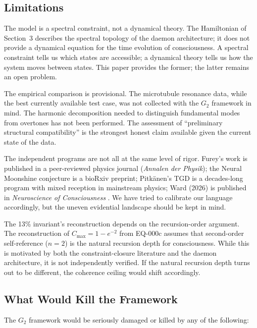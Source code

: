 \documentclass[12pt,a4paper]{article}
\begin{document}
\subsection{Limitations}

The model is a spectral constraint, not a dynamical theory. The Hamiltonian of Section~3 describes the spectral topology of the daemon architecture; it does not provide a dynamical equation for the time evolution of consciousness. A spectral constraint tells us which states are accessible; a dynamical theory tells us how the system moves between states. This paper provides the former; the latter remains an open problem.

The empirical comparison is provisional. The microtubule resonance data, while the best currently available test case, was not collected with the $G_2$ framework in mind. The harmonic decomposition needed to distinguish fundamental modes from overtones has not been performed. The assessment of ``preliminary structural compatibility'' is the strongest honest claim available given the current state of the data.

The independent programs are not all at the same level of rigor. Furey's work is published in a peer-reviewed physics journal (\textit{Annalen der Physik}); the Neural Moonshine conjecture is a bioRxiv preprint; Pitk\"anen's TGD is a decades-long program with mixed reception in mainstream physics; Ward (2026) is published in \textit{Neuroscience of Consciousness} \citep{Ward2026}. We have tried to calibrate our language accordingly, but the uneven evidential landscape should be kept in mind.

The 13\% invariant's reconstruction depends on the recursion-order argument. The reconstruction of $C_{\max} = 1 - e^{-2}$ from EQ-000c assumes that second-order self-reference ($n = 2$) is the natural recursion depth for consciousness. While this is motivated by both the constraint-closure literature and the daemon architecture, it is not independently verified. If the natural recursion depth turns out to be different, the coherence ceiling would shift accordingly.

\subsection{What Would Kill the Framework}

The $G_2$ framework would be seriously damaged or killed by any of the following:
\end{document}
